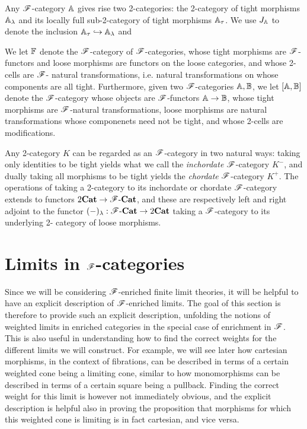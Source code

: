\documentclass[../thesis.tex]{subfiles}
\begin{document}
  Any ${\mathscr{F}}$-category ${\mathbb{A}}$ gives rise two 2-categories: the 2-category of tight morphisms ${\mathbb{A}}_
  \lambda$ and its locally full sub-2-category of tight morphisms ${\mathbb{A}}_\tau$. We use $J_{\mathbb{A}}$ to
  denote the inclusion ${\mathbb{A}}_\tau \hookrightarrow {\mathbb{A}}_\lambda$ and

  We let ${\mathbb{F}}$ denote the ${\mathscr{F}}$-category of ${\mathscr{F}}$-categories, whose tight morphisms are ${\mathscr{F}}$-%
  functors and loose morphisms are functors on the loose categories, and whose 2-cells are ${\mathscr{F}}$-%
  natural transformations, i.e. natural transformations on whose components are all tight.
  Furthermore, given two ${\mathscr{F}}$-categories ${\mathbb{A}},{\mathbb{B}}$, we let $[{\mathbb{A}},{\mathbb{B}}]$ denote the ${\mathscr{F}}$-category
  whose objects are ${\mathscr{F}}$-functors ${\mathbb{A}} \to {\mathbb{B}}$, whose tight morphisms are ${\mathscr{F}}$-natural
  transformations, loose morphisms are natural transformations whose componenets need not be
  tight, and whose 2-cells are modifications.

  Any 2-category $K$ can be regarded as an ${\mathscr{F}}$-category in two natural ways: taking only
  identities to be tight yields what we call the \emph{inchordate} ${\mathscr{F}}$-category $K^-$, and 
  dually taking all morphisms to be tight yields the \emph{chordate} ${\mathscr{F}}$-category $K^+$. The
  operations of taking a 2-category to its inchordate or chordate ${\mathscr{F}}$-category extends to
  functors $2{\mathbf{Cat}} \to {\mathscr{F}}\text-{\mathbf{Cat}}$, and these are respectively left and right adjoint to the
  functor $(-)_\lambda : {\mathscr{F}}\text-{\mathbf{Cat}} \to 2{\mathbf{Cat}}$ taking a ${\mathscr{F}}$-category to its underlying 2-%
  category of loose morphisms.


  \section{Limits in \texorpdfstring{${\mathscr{F}}$}{F}-categories}
  Since we will be considering ${\mathscr{F}}$-enriched finite limit theories, it will be helpful to have an
  explicit description of ${\mathscr{F}}$-enriched limits. The goal of this section is therefore to provide
  such an explicit description, unfolding the notions of weighted limits in enriched categories in
  the special case of enrichment in ${\mathscr{F}}$. This is also useful in understanding how to find the
  correct weights for the different limits we will construct. For example, we will see later how
  cartesian morphisms, in the context of fibrations, can be described in terms of a certain weighted
  cone being a limiting cone, similar to how monomorphisms can be described in terms of a certain
  square being a pullback. Finding the correct weight for this limit is however not immediately
  obvious, and the explicit description is helpful also in proving the proposition that morphisms
  for which this weighted cone is limiting is in fact cartesian, and vice versa.
\end{document}

